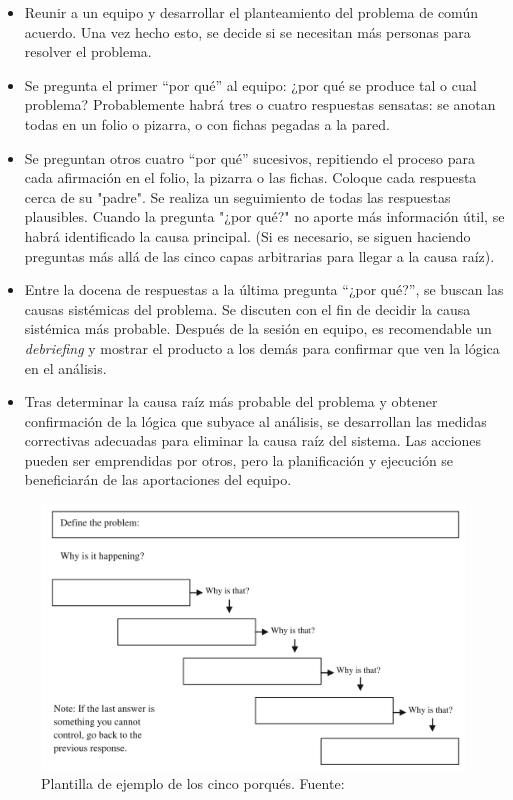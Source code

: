 \begin{itemize}
    \item Reunir a un equipo y desarrollar el planteamiento del problema de común acuerdo. Una vez hecho esto, se decide si se necesitan más personas para resolver el problema.
    \item Se pregunta el primer ``por qué'' al equipo: ¿por qué se produce tal o cual problema? Probablemente habrá tres o cuatro respuestas sensatas: se anotan todas en un folio o pizarra, o con fichas pegadas a la pared.
    \item Se preguntan otros cuatro ``por qué'' sucesivos, repitiendo el proceso para cada afirmación en el folio, la pizarra o las fichas. Coloque cada respuesta cerca de su "padre". Se realiza un seguimiento de todas las respuestas plausibles. Cuando la pregunta "¿por qué?" no aporte más información útil, se habrá identificado la causa principal. (Si es necesario, se siguen haciendo preguntas más allá de las cinco capas arbitrarias para llegar a la causa raíz).
    \item Entre la docena de respuestas a la última pregunta ``¿por qué?'', se buscan las causas sistémicas del problema. Se discuten con el fin de decidir la causa sistémica más probable. Después de la sesión en equipo, es recomendable un \textit{debriefing} y mostrar el producto a los demás para confirmar que ven la lógica en el análisis.
    \item Tras determinar la causa raíz más probable del problema y obtener confirmación de la lógica que subyace al análisis, se desarrollan las medidas correctivas adecuadas para eliminar la causa raíz del sistema. Las acciones pueden ser emprendidas por otros, pero la planificación y ejecución se beneficiarán de las aportaciones del equipo.
\end{itemize}

\begin{figure}
    \centering
    \includegraphics[width=\textwidth]{img/five-whys.png}
    \caption{Plantilla de ejemplo de los cinco porqués. Fuente: }
    \label{fig:five-whys}
\end{figure}

